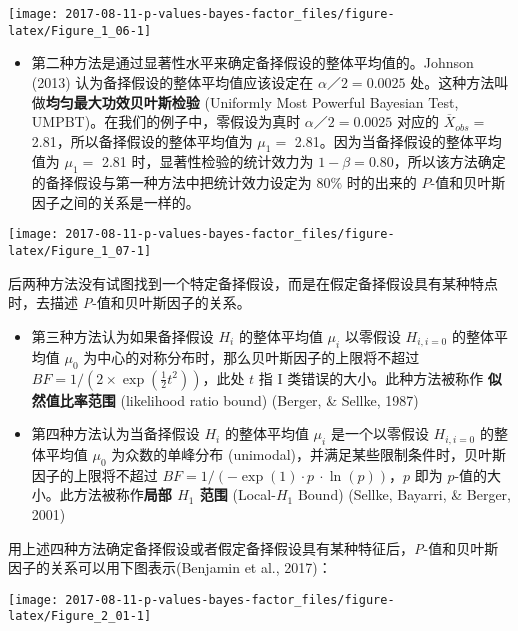 \documentclass[]{article}
\providecommand{\tightlist}{%
  \setlength{\itemsep}{0pt}\setlength{\parskip}{0pt}}
\begin{document}
\begin{center}\texttt{[image: 2017-08-11-p-values-bayes-factor\_files/figure-latex/Figure\_1\_06-1]} \end{center}

\begin{itemize}
\tightlist
\item
  第二种方法是通过显著性水平来确定备择假设的整体平均值的。Johnson (2013)
  认为备择假设的整体平均值应该设定在 \(\alpha／2 = 0.0025\)
  处。这种方法叫做\textbf{均匀最大功效贝叶斯检验} (Uniformly Most
  Powerful Bayesian Test, UMPBT)。在我们的例子中，零假设为真时
  \(\alpha／2 = 0.0025\) 对应的 \(\overline{X}_{obs}=\)
  2.81，所以备择假设的整体平均值为 \(\mu_1=\)
  2.81。因为当备择假设的整体平均值为 \(\mu_1=\) 2.81
  时，显著性检验的统计效力为
  \(1-\beta=0.80\)，所以该方法确定的备择假设与第一种方法中把统计效力设定为
  \(80\%\) 时的出来的 \(P\)-值和贝叶斯因子之间的关系是一样的。
\end{itemize}

\begin{center}\texttt{[image: 2017-08-11-p-values-bayes-factor\_files/figure-latex/Figure\_1\_07-1]} \end{center}

后两种方法没有试图找到一个特定备择假设，而是在假定备择假设具有某种特点时，去描述
\emph{P}-值和贝叶斯因子的关系。

\begin{itemize}
\tightlist
\item
  第三种方法认为如果备择假设 \(H_{i}\) 的整体平均值 \(\mu_i\) 以零假设
  \(H_{i, i=0}\) 的整体平均值 \(\mu_0\)
  为中心的对称分布时，那么贝叶斯因子的上限将不超过
  \(BF = 1/(2\times \exp(\frac{1}{2}t^2))\)，此处 \(t\) 指 I
  类错误的大小。此种方法被称作 \textbf{似然值比率范围} (likelihood ratio
  bound) (Berger, \& Sellke, 1987)
\item
  第四种方法认为当备择假设 \(H_{i}\) 的整体平均值 \(\mu_i\)
  是一个以零假设 \(H_{i, i=0}\) 的整体平均值 \(\mu_0\) 为众数的单峰分布
  (unimodal)，并满足某些限制条件时，贝叶斯因子的上限将不超过
  \(BF=1/(-\exp(1) \cdot p \ \cdot \ln(p))\)，\(p\) 即为
  \(p\)-值的大小。此方法被称作\textbf{局部 \(H_1\) 范围} (Local-\(H_1\)
  Bound) (Sellke, Bayarri, \& Berger, 2001)
\end{itemize}

用上述四种方法确定备择假设或者假定备择假设具有某种特征后，\emph{P}-值和贝叶斯因子的关系可以用下图表示(Benjamin
et al., 2017)：

\begin{center}\texttt{[image: 2017-08-11-p-values-bayes-factor\_files/figure-latex/Figure\_2\_01-1]} \end{center}
\end{document}
